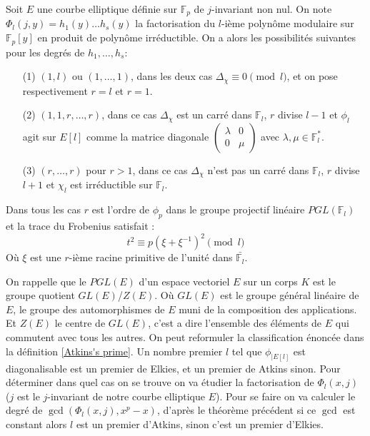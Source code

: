 \documentclass[12pt]{article}
\begin{document}
\begin{thm}
\label{thm calcul r}
Soit $E$ une courbe elliptique définie sur $\mathbb{F}_p$ de $j$-invariant non nul. On note $\Phi_l(j,y) = h_1(y) \ldots h_s(y)$ la factorisation du $l$-ième polynôme modulaire sur $\mathbb{F}_p[y]$ en produit de polynôme irréductible. On a alors les possibilités suivantes pour les degrés de $h_1, \ldots, h_s$:
\begin{itemize}
\item[(1)] $(1,l)$ ou $(1,\ldots,1)$, dans les deux cas $\Delta_{\chi} \equiv 0 \pmod l$, et on pose respectivement $r=l $ et $r=1$.
\item[(2)] $(1,1,r,\ldots,r)$, dans ce cas $\Delta_{\chi}$ est un carré dans $\mathbb{F}_l$, $r$ divise $l-1$ et $\phi_l$ agit sur $E[l]$ comme la matrice diagonale $\begin{pmatrix}
\lambda & 0 \\
0 & \mu
\end{pmatrix}$ avec $\lambda,\mu \in \mathbb{F}_l^*$.
\item[(3)] $(r, \ldots, r)$ pour $r>1$, dans ce cas $\Delta_{\chi}$ n'est pas un carré dans $\mathbb{F}_l$, $r$ divise $l+1$ et $\chi_l$ est irréductible sur $\mathbb{F}_l$.
\end{itemize}

Dans tous les cas $r$ est l'ordre de $\phi_p$ dans le groupe projectif linéaire $PGL(\mathbb{F}_l)$ et la trace du Frobenius satisfait : 
\begin{equation}
\label{trace with root of unity}
t^2 \equiv p(\xi+\xi^{-1})^2 \pmod l
\end{equation}
Où $\xi$ est une $r$-ième racine primitive de l'unité dans $\bar{\mathbb{F}_l}$.
\end{thm}
 On rappelle que le $PGL(E)$ d'un espace vectoriel $E$ sur un corps $K$ est le groupe quotient $GL(E)$/$Z(E)$. Où $GL(E)$ est le groupe général linéaire de $E$, le groupe des automorphismes de $E$ muni de la composition des applications. Et $Z(E)$ le centre de $GL(E)$, c'est a dire l'ensemble des éléments de $E$ qui commutent avec tous les autres.
\newline
On peut reformuler la classification énoncée dans la définition \ref{Atkins's prime}. Un nombre premier $l$ tel que $\phi_{|E[l]}$ est diagonalisable est un premier de Elkies, et un premier de Atkins sinon. Pour déterminer dans quel cas on se trouve on va étudier la factorisation de $\Phi_l(x,j)$ ($j$ est le $j$-invariant de notre courbe elliptique $E$). Pour se faire on va calculer le degré de $\gcd(\Phi_l(x,j),x^p-x)$, d'après le théorème précédent si ce $\gcd$ est constant alors $l$ est un premier d'Atkins, sinon c'est un premier d'Elkies.
\end{document}
